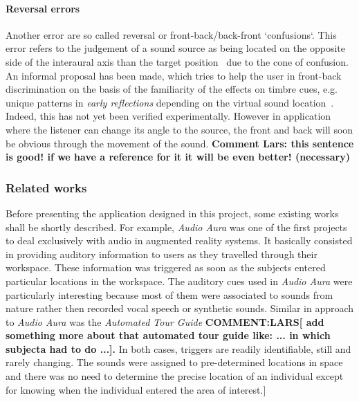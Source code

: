 \documentclass[journal]{IEEEtran}
\begin{document}
\paragraph{Reversal errors}
Another error are so called reversal or front-back/back-front `confusions`. This error refers to the judgement of a sound source as being located on the opposite side of the interaural axis than the target position~\cite{begault2001} due to the cone of confusion. An informal proposal has been made, which tries to help the user in front-back discrimination on the basis of the familiarity of the effects on timbre cues, e.g. unique patterns in \emph{early reflections} depending on the virtual sound location~\cite{begault1992}. Indeed, this has not yet been verified experimentally. However in application where the listener can change its angle to the source, the front and back will soon be obvious through the movement of the sound. \textbf{Comment Lars: this sentence is good! if we have a reference for it it will be even better! (necessary)}\\

\subsubsection{Related works}
Before presenting the application designed in this project, some existing works shall be shortly described. For example, \emph{Audio Aura} \cite{mynatt1997} was one of the first projects to deal exclusively with audio in augmented reality systems. It basically consisted in providing auditory information to users as they travelled through their workspace. These information was triggered as soon as the subjects entered particular locations in the workspace. The auditory cues used in \emph{Audio Aura} were particularly interesting because most of them were associated to sounds from nature rather then recorded vocal speech or synthetic sounds. Similar in approach to \emph{Audio Aura} was the \emph{Automated Tour Guide} \cite{bederson1995} \textbf{COMMENT:LARS[ add something more about that automated tour guide like: ... in which subjecta had to do ...].} In both cases, triggers are readily identifiable, still and rarely changing. The sounds were assigned to pre-determined locations in space and there was no need to determine the precise location of an individual except for knowing when the individual entered the area of interest.]
\end{document}
